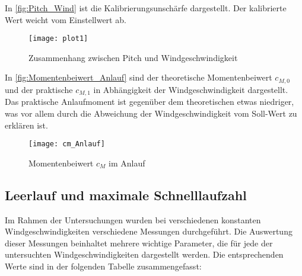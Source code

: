 In \autoref{fig:Pitch_Wind} ist die Kalibrierungsunschärfe dargestellt. Der kalibrierte Wert weicht vom Einstellwert ab.
\begin{figure}[H]
    \centering
    \texttt{[image: plot1]}
    \caption{Zusammenhang zwischen Pitch und Windgeschwindigkeit}
    \label{fig:Pitch_Wind}
\end{figure}

In \autoref{fig:Momentenbeiwert_Anlauf} sind der theoretische Momentenbeiwert $c_{M,0}$ und der praktische $c_{M,1}$ in Abhängigkeit der Windgeschwindigkeit dargestellt.
Das praktische Anlaufmoment ist gegenüber dem theoretischen etwas niedriger, was vor allem durch die Abweichung der Windgeschwindigkeit vom Soll-Wert zu erklären ist.
\begin{figure}[H]
    \centering
    \texttt{[image: cm\_Anlauf]}
    \caption{Momentenbeiwert $c_M$ im Anlauf}
    \label{fig:Momentenbeiwert_Anlauf}
\end{figure}

\subsection{Leerlauf und maximale Schnelllaufzahl}
Im Rahmen der Untersuchungen wurden bei verschiedenen konstanten Windgeschwindigkeiten verschiedene Messungen durchgeführt.
 Die Auswertung dieser Messungen beinhaltet mehrere wichtige Parameter, die für jede der untersuchten Windgeschwindigkeiten dargestellt werden. Die entsprechenden Werte sind in der folgenden Tabelle zusammengefasst:

